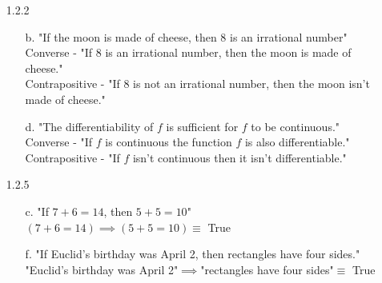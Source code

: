 \documentclass[11pt]{amsart}
\theoremstyle{definition}
\newcommand*{\lxor}{\veebar}
\begin{document}
\begin{itemize}
\begin{itemize}
    \item[b.]
    $(A \lor B) \land \neg(A \land B)$
    \begin{equation*}
    \begin{array}{ccccc}
        A & B & A \lor B & \neg(A \land B) & (A \lor B) \land \neg(A \land B) \\
        T & T & T & F & F \\
        T & F & T & T & T \\
        F & T & T & T & T \\
        F & F & F & T & F
    \end{array}
    \end{equation*}
    \begin{proof}  
        $A \lxor B \equiv (A \lor B) \land \neg(A \land B)$ is demonstrated by the equivalent outcomes of their truth tables.
    \end{proof}
    
\end{itemize}



\item[1.2.2]
\begin{itemize}
    \item[b.] "If the moon is made of cheese, then 8 is an irrational number" \\
        Converse - "If 8 is an irrational number, then the moon is made of cheese."\\
        Contrapositive - "If 8 is not an irrational number, then the moon isn't made of cheese."

    \item[d.] "The differentiability of $f$ is sufficient for $f$ to be continuous." \\
        Converse - "If $f$ is continuous the function $f$ is also differentiable."\\
        Contrapositive - "If $f$ isn't continuous then it isn't differentiable."
    
\end{itemize}

\item[1.2.5]
\begin{itemize}
    \item[c.] "If $7+6=14$, then $5+5=10$" \\
    $(7+6=14)\implies(5+5=10)\equiv$ True

    \item[f.] "If Euclid's birthday was April 2, then rectangles have four sides." \\
    "Euclid's birthday was April 2"$\implies$"rectangles have four sides"$\equiv$ True


\end{itemize}
\end{itemize}
\end{document}
